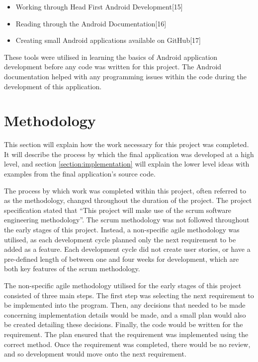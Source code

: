 \documentclass{article}
\begin{document}
\begin{itemize}
	\item Working through Head First Android Development[15]
	\item Reading through the Android Documentation[16]
	\item Creating small Android applications available on GitHub[17]
\end{itemize}

These tools were utilised in learning the basics of Android application development before any code was written for this project. The Android documentation helped with any programming issues within the code during the development of this application. 

\section{Methodology}
\label{section:methodology}

This section will explain how the work necessary for this project was completed. It will describe the process by which the final application was developed at a high level, and section \ref{section:implementation} will explain the lower level ideas with examples from the final application's source code. \par

The process by which work was completed within this project, often referred to as the methodology, changed throughout the duration of the project. The project specification stated that ``This project will make use of the scrum software engineering methodology''. The scrum methodology was not followed throughout the early stages of this project. Instead, a non-specific agile methodology was utilised, as each development cycle planned only the next requirement to be added as a feature. Each development cycle did not create user stories, or have a pre-defined length of between one and four weeks for development, which are both key features of the scrum methodology. \par

The non-specific agile methodology utilised for the early stages of this project consisted of three main steps. The first step was selecting the next requirement to be implemented into the program. Then, any decisions that needed to be made concerning implementation details would be made, and a small plan would also be created detailing these decisions. Finally, the code would be written for the requirement. The plan ensured that the requirement was implemented using the correct method. Once the requirement was completed, there would be no review, and so development would move onto the next requirement. \par
\end{document}
